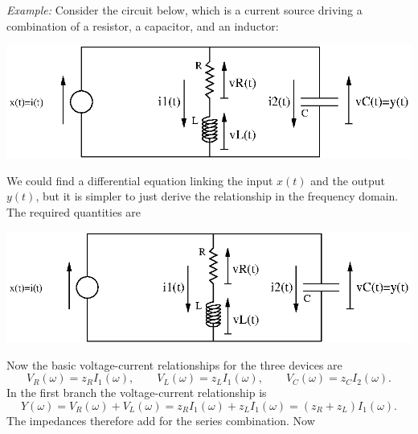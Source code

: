 \documentclass[10pt]{beamer}
\begin{document}
{\em Example:}  Consider the circuit below, which is a current source driving a combination of a resistor, a capacitor, and an inductor:
\begin{center}
  \includegraphics{circuitlrc}
\end{center}
We could find a differential equation linking the input $x(t)$ and the output $y(t)$, but it is simpler to just derive the relationship in the frequency domain.  The required quantities are
\begin{center}
  \includegraphics{circuitlrc2}
\end{center}
Now the basic voltage-current relationships for the three devices are
\begin{equation*}
  V_R(\omega) = z_R I_1(\omega), \qquad V_L(\omega) = z_L I_1(\omega), \qquad 
  V_C(\omega) = z_C I_2(\omega).
\end{equation*}
In the first branch the voltage-current relationship is
\begin{equation*}
  Y(\omega) = V_R(\omega) + V_L(\omega) = z_R I_1(\omega) + z_L I_1(\omega)
  = (z_R + z_L) I_1(\omega).
\end{equation*}
The impedances therefore add for the series combination.  Now
\end{document}
